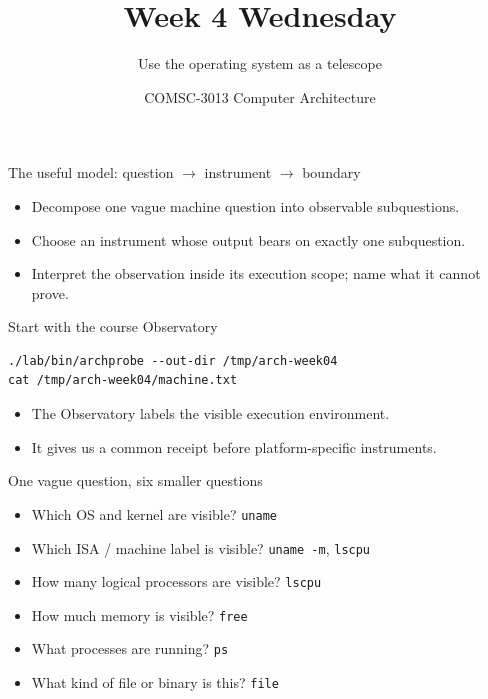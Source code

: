 \documentclass{beamer}
\title{Week 4 Wednesday}
\subtitle{Use the operating system as a telescope}
\author{COMSC-3013 Computer Architecture}
\date{}
\begin{document}
\begin{frame}
  \titlepage
\end{frame}


\begin{frame}{The useful model: question $\rightarrow$ instrument $\rightarrow$ boundary}
\begin{itemize}
  \item Decompose one vague machine question into observable subquestions.
  \item Choose an instrument whose output bears on exactly one subquestion.
  \item Interpret the observation inside its execution scope; name what it cannot prove.
\end{itemize}
\end{frame}

\begin{frame}[fragile]{Start with the course Observatory}
\begin{lstlisting}
./lab/bin/archprobe --out-dir /tmp/arch-week04
cat /tmp/arch-week04/machine.txt
\end{lstlisting}
\begin{itemize}
  \item The Observatory labels the visible execution environment.
  \item It gives us a common receipt before platform-specific instruments.
\end{itemize}
\end{frame}

\begin{frame}{One vague question, six smaller questions}
\begin{itemize}
  \item Which OS and kernel are visible? \hfill \texttt{uname}
  \item Which ISA / machine label is visible? \hfill \texttt{uname -m}, \texttt{lscpu}
  \item How many logical processors are visible? \hfill \texttt{lscpu}
  \item How much memory is visible? \hfill \texttt{free}
  \item What processes are running? \hfill \texttt{ps}
  \item What kind of file or binary is this? \hfill \texttt{file}
\end{itemize}
\end{frame}
\end{document}
